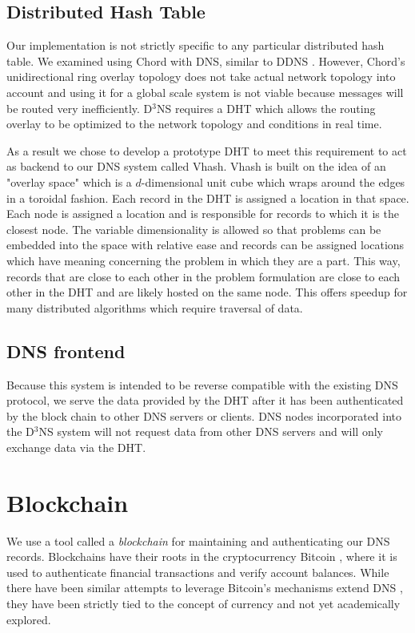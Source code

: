 \documentclass[11pt]{IEEEtran} %
\begin{document}
\subsection{Distributed Hash Table}
Our implementation is not strictly specific to any particular distributed hash table.  We examined using Chord \cite{chord} with DNS, similar to DDNS \cite{cox}.  However, Chord’s unidirectional ring overlay topology does not take actual network topology into account and using it for a global scale system is not viable because messages will be routed very inefficiently. D$^3$NS requires a DHT which allows the routing overlay to be optimized to the network topology and conditions in real time.

As a result we chose to develop a prototype DHT to meet this requirement to act as backend to our DNS system called Vhash. Vhash is built on the idea of an "overlay space" which is a $d$-dimensional unit cube which wraps around the edges in a toroidal fashion. Each record in the DHT is assigned a location in that space. Each node is assigned a location and is responsible for records to which it is the closest node. The variable dimensionality is allowed so that problems can be embedded into the space with relative ease and records can be assigned locations which have meaning concerning the problem in which they are a part. This way, records that are close to each other in the problem formulation are close to each other in the DHT and are likely hosted on the same node. This offers speedup for many distributed algorithms which require traversal of data.



\subsection{DNS frontend}
Because this system is intended to be reverse compatible with the existing DNS protocol, we serve the data provided by the DHT after it has been authenticated by the block chain to other DNS servers or clients. DNS nodes incorporated into the D$^3$NS system will not request data from other DNS servers and will only exchange data via the DHT.


\section{Blockchain}
We use a tool called a \emph{blockchain} for maintaining and  authenticating our DNS records.  Blockchains have their roots in the cryptocurrency Bitcoin \cite{bitcoin}, where it is used to authenticate financial transactions and verify account balances.  While there have been similar attempts to leverage Bitcoin's mechanisms extend DNS \cite{namecoin}, they have been strictly tied to the concept of currency and not yet academically explored.
\end{document}
